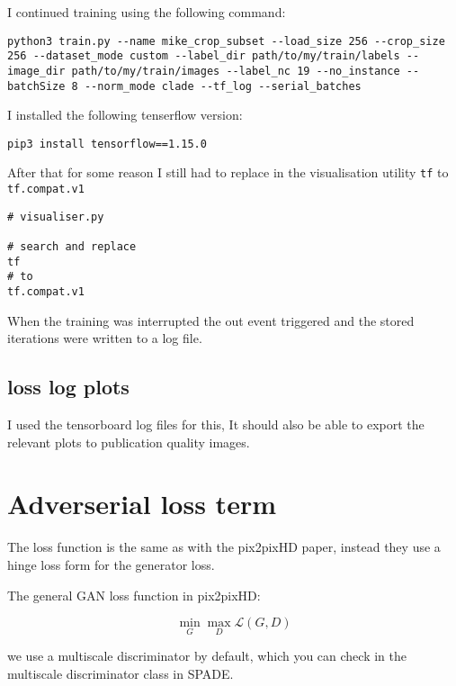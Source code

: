 \documentclass{memoir}
\begin{document}
I continued training using the following command:

\begin{verbatim}
python3 train.py --name mike_crop_subset --load_size 256 --crop_size 256 --dataset_mode custom --label_dir path/to/my/train/labels --image_dir path/to/my/train/images --label_nc 19 --no_instance --batchSize 8 --norm_mode clade --tf_log --serial_batches
\end{verbatim}

I installed the following tenserflow version:

\begin{verbatim}
pip3 install tensorflow==1.15.0
\end{verbatim}

After that for some reason I still had to replace in the visualisation utility \texttt{tf} to \texttt{tf.compat.v1}

\begin{verbatim}
# visualiser.py

# search and replace
tf
# to
tf.compat.v1
\end{verbatim}

When the training was interrupted the out event triggered and the stored iterations were written to a log file.

\section{loss log plots}
\label{sec:org3a31238}

I used the tensorboard log files for this, It should also be able to export the
relevant plots to publication quality images.


\chapter{Adverserial loss term}
\label{sec:org6b2e8d6}

The loss function is the same as with the pix2pixHD paper, instead they use a
hinge loss form for the generator loss.

The general GAN loss function in pix2pixHD:

\[
\min_{G} \max_{D} \mathcal{L}(G, D)
\]

we use a multiscale discriminator by default, which you can check in the
multiscale discriminator class in SPADE.
\end{document}
